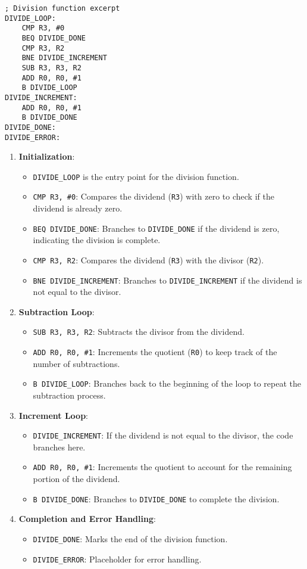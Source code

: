 \documentclass{article}
\begin{document}
\begin{lstlisting}[language=MyASM]
; Division function excerpt
DIVIDE_LOOP:
    CMP R3, #0
    BEQ DIVIDE_DONE
    CMP R3, R2
    BNE DIVIDE_INCREMENT
    SUB R3, R3, R2
    ADD R0, R0, #1
    B DIVIDE_LOOP
DIVIDE_INCREMENT:
    ADD R0, R0, #1
    B DIVIDE_DONE
DIVIDE_DONE:
DIVIDE_ERROR:
\end{lstlisting}
\begin{enumerate}
    \item \textbf{Initialization}:
    \begin{itemize}
        \item \texttt{DIVIDE\_LOOP} is the entry point for the division function.
        \item \texttt{CMP R3, \#0}: Compares the dividend (\texttt{R3}) with zero to check if the dividend is already zero.
        \item \texttt{BEQ DIVIDE\_DONE}: Branches to \texttt{DIVIDE\_DONE} if the dividend is zero, indicating the division is complete.
        \item \texttt{CMP R3, R2}: Compares the dividend (\texttt{R3}) with the divisor (\texttt{R2}).
        \item \texttt{BNE DIVIDE\_INCREMENT}: Branches to \texttt{DIVIDE\_INCREMENT} if the dividend is not equal to the divisor.
    \end{itemize}

    \item \textbf{Subtraction Loop}:
    \begin{itemize}
        \item \texttt{SUB R3, R3, R2}: Subtracts the divisor from the dividend.
        \item \texttt{ADD R0, R0, \#1}: Increments the quotient (\texttt{R0}) to keep track of the number of subtractions.
        \item \texttt{B DIVIDE\_LOOP}: Branches back to the beginning of the loop to repeat the subtraction process.
    \end{itemize}

    \item \textbf{Increment Loop}:
    \begin{itemize}
        \item \texttt{DIVIDE\_INCREMENT}: If the dividend is not equal to the divisor, the code branches here.
        \item \texttt{ADD R0, R0, \#1}: Increments the quotient to account for the remaining portion of the dividend.
        \item \texttt{B DIVIDE\_DONE}: Branches to \texttt{DIVIDE\_DONE} to complete the division.
    \end{itemize}

    \item \textbf{Completion and Error Handling}:
    \begin{itemize}
        \item \texttt{DIVIDE\_DONE}: Marks the end of the division function.
        \item \texttt{DIVIDE\_ERROR}: Placeholder for error handling.
    \end{itemize}
\end{enumerate}
\end{document}
